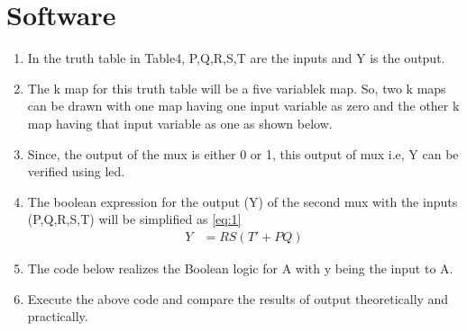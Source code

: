 \documentclass{article}
\begin{document}
\section{Software}
		\begin{enumerate}
			\item In the truth table in Table4, P,Q,R,S,T are the inputs and Y is the output.
				
			\item The k map for this truth table will be a five variablek map. So, two k maps can be drawn with one map having one input variable as zero and the other k map having that input variable as one as shown below.
				
			\item Since, the output of the mux is either 0 or 1, this output of mux i.e, Y can be verified using led.
			\item The boolean expression for the output (Y) of the second mux with the inputs (P,Q,R,S,T) will be simplified as \ref{eq:1}
				\begin{align}
					{Y} &= {RS(T'+PQ)}
					\label{eq:1}
				\end{align}
				\item The code below realizes the Boolean logic for A with y being the input to A.\\
	\item Execute the above code and compare the results of output theoretically and practically.
	\end{enumerate}
\end{document}
